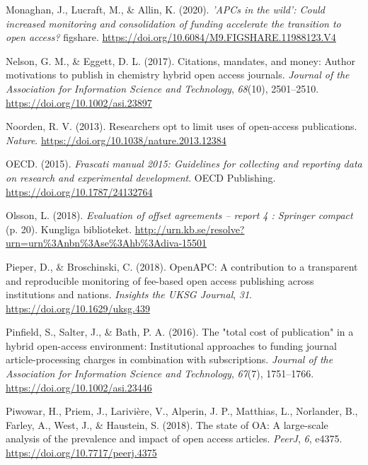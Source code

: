 \documentclass[a4paper,man,floatsintext,longtable,noextraspace,12pt]{apa6}
\newenvironment{CSLReferences}%
  {}%
  {\par}
\begin{document}
\begin{CSLReferences}{1}{0}
\leavevmode\hypertarget{ref-Monaghan_2020}{}%
Monaghan, J., Lucraft, M., \& Allin, K. (2020). \emph{'APCs in the
wild': Could increased monitoring and consolidation of funding
accelerate the transition to open access?} figshare.
\url{https://doi.org/10.6084/M9.FIGSHARE.11988123.V4}

\leavevmode\hypertarget{ref-Nelson_2017}{}%
Nelson, G. M., \& Eggett, D. L. (2017). Citations, mandates, and money:
Author motivations to publish in chemistry hybrid open access journals.
\emph{Journal of the Association for Information Science and
Technology}, \emph{68}(10), 2501--2510.
\url{https://doi.org/10.1002/asi.23897}

\leavevmode\hypertarget{ref-Van_Noorden_2013}{}%
Noorden, R. V. (2013). Researchers opt to limit uses of open-access
publications. \emph{Nature}.
\url{https://doi.org/10.1038/nature.2013.12384}

\leavevmode\hypertarget{ref-Frascati}{}%
OECD. (2015). \emph{Frascati manual 2015: Guidelines for collecting and
reporting data on research and experimental development}. {OECD
Publishing}. \url{https://doi.org/10.1787/24132764}

\leavevmode\hypertarget{ref-Olsson1271866}{}%
Olsson, L. (2018). \emph{Evaluation of offset agreements -- report 4 :
Springer compact} (p. 20). Kungliga biblioteket.
\url{http://urn.kb.se/resolve?urn=urn\%3Anbn\%3Ase\%3Ahb\%3Adiva-15501}

\leavevmode\hypertarget{ref-Pieper_2018}{}%
Pieper, D., \& Broschinski, C. (2018). {OpenAPC}: A contribution to a
transparent and reproducible monitoring of fee-based open access
publishing across institutions and nations. \emph{Insights the {UKSG}
Journal}, \emph{31}. \url{https://doi.org/10.1629/uksg.439}

\leavevmode\hypertarget{ref-Pinfield_2016}{}%
Pinfield, S., Salter, J., \& Bath, P. A. (2016). The "total cost of
publication" in a hybrid open-access environment: Institutional
approaches to funding journal article-processing charges in combination
with subscriptions. \emph{Journal of the Association for Information
Science and Technology}, \emph{67}(7), 1751--1766.
\url{https://doi.org/10.1002/asi.23446}

\leavevmode\hypertarget{ref-Piwowar_2018}{}%
Piwowar, H., Priem, J., Larivière, V., Alperin, J. P., Matthias, L.,
Norlander, B., Farley, A., West, J., \& Haustein, S. (2018). The state
of {OA}: A large-scale analysis of the prevalence and impact of open
access articles. \emph{{PeerJ}}, \emph{6}, e4375.
\url{https://doi.org/10.7717/peerj.4375}


\end{CSLReferences}
\end{document}
